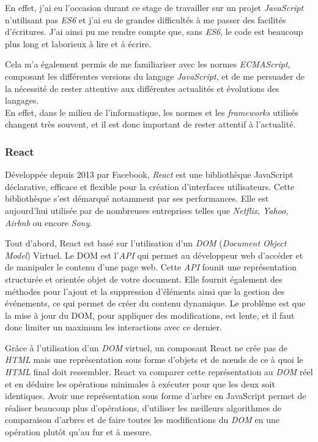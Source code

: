 \documentclass[12pt,a4paper]{article}
\begin{document}
  \bigskip

  En effet, j'ai eu l'occasion durant ce stage de travailler sur un projet
  \emph{JavaScript} n'utilisant pas \emph{ES6} et j'ai eu de grandes
  difficultés à me passer des facilités d'écritures. J'ai ainsi pu me
  rendre compte que, sans \emph{ES6}, le code est beaucoup plus long et
  laborieux à lire et à écrire.

  \bigskip

  Cela m'a également permis de me familiariser avec les normes
  \emph{ECMAScript}, composant les différentes versions du langage
  \emph{JavaScript}, et de me persuader de la nécessité de rester
  attentive aux différentes actualités et évolutions des langages.\\
  En effet, dans le milieu de l'informatique, les normes et les
  \emph{frameworks} utilisés changent très souvent, et il est donc
  important de rester attentif à l'actualité.

  \bigskip

  \subsubsection{React}\label{react}

  \bigskip

  Développée depuis 2013 par Facebook, \emph{React} est une bibliothèque
  JavaScript déclarative, efficace et flexible pour la création
  d'interfaces utilisateurs. Cette bibliothèque s'est démarqué notamment
  par ses performances. Elle est aujourd'hui utilisée par de nombreuses
  entreprises telles que \emph{Netflix}, \emph{Yahoo}, \emph{Airbnb} ou
  encore \emph{Sony}.

  \bigskip

  Tout d'abord, React est basé sur l'utilisation d'un \emph{DOM}
  (\emph{Document Object Model}) Virtuel. Le DOM est l'\emph{API} qui
  permet au développeur web d'accéder et de manipuler le contenu d'une
  page web. Cette \emph{API} founit une représentation structurée et
  orientée objet de votre document. Elle fournit également des méthodes
  pour l'ajout et la suppression d'éléments ainsi que la gestion des
  événements, ce qui permet de créer du contenu dynamique. Le problème est
  que la mise à jour du DOM, pour appliquer des modifications, est lente,
  et il faut donc limiter un maximum les interactions avec ce dernier.

  \bigskip

  Grâce à l'utilisation d'un \emph{DOM} virtuel, un composant React ne
  crée pas de \emph{HTML} mais une représentation sous forme d'objets et
  de nœuds de ce à quoi le \emph{HTML} final doit ressembler. React va
  comparer cette représentation au \emph{DOM} réel et en déduire les
  opérations minimales à exécuter pour que les deux soit identiques. Avoir
  une représentation sous forme d'arbre en JavaScript permet de réaliser
  beaucoup plus d'opérations, d'utiliser les meilleurs algorithmes de
  comparaison d'arbres et de faire toutes les modifications du \emph{DOM}
  en une opération plutôt qu'au fur et à mesure.
\end{document}
